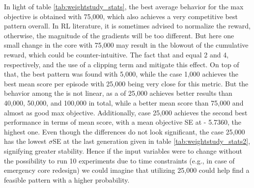 In light of table \ref{tab:weightstudy_stats}, the best average behavior for the max objective is obtained with  75,000, which also achieves a very competitive best pattern overall. In RL literature, it is sometimes advised to normalize the reward, otherwise, the magnitude of the gradients will be too different. But here one small change in the core with 75,000 may result in the blowout of the cumulative reward, which could be counter-intuitive. The fact that  and  equal 2 and 4, respectively, and the use of a clipping term and  mitigate this effect. On top of that, the best pattern was found with  5,000,  while the case 1,000 achieves the best mean score per episode with 25,000 being very close for this metric. But the behavior among the  is not linear, as a  of 25,000 achieves better results than 40,000, 50,000, and 100,000 in total, while a better mean score than 75,000 and almost as good max objective.  Additionally, case 25,000 achieves the second best performance in terms of mean score, with a mean objective SE at - 5.7360, the highest one. Even though the differences do not look significant, the case 25,000 has the lowest $\sigma$SE at the last generation given in table \ref{tab:weightstudy_stats2}, signifying greater stability. Hence if the input variables were to change without the possibility to run 10 experiments due to time constraints (e.g., in case of emergency core redesign) we could imagine that utilizing 25,000 could help find a feasible pattern with a higher probability.
